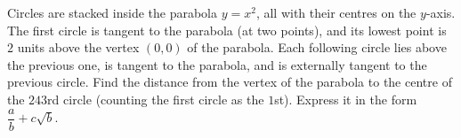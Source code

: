 Circles are stacked inside the parabola $y=x^2$, all with their centres on the $y$-axis. The first circle is tangent to the parabola (at two points), and its lowest point is $2$ units above the vertex $(0,0)$ of the parabola. Each following circle lies above the previous one, is tangent to the parabola, and is externally tangent to the previous circle. Find the distance from the vertex of the parabola to the centre of the $243$rd circle (counting the first circle as the $1$st). Express it in the form $\dfrac ab+c\sqrt b$.
